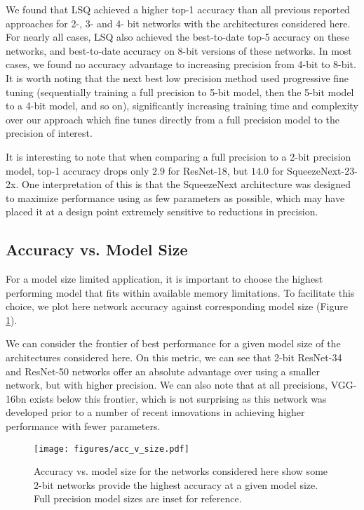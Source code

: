 \documentclass{article}
\begin{document}
We found that LSQ achieved a higher top-1 accuracy than all previous reported approaches for 2-, 3- and 4- bit networks with the architectures considered here.
For nearly all cases, LSQ also achieved the best-to-date top-5 accuracy on these networks, and best-to-date accuracy on 8-bit versions of these networks.
In most cases, we found no accuracy advantage to increasing precision from 4-bit to 8-bit.
It is worth noting that the next best low precision method \citep{jung2018joint} used progressive fine tuning (sequentially training a full precision to 5-bit model, then the 5-bit model to a 4-bit model, and so on), significantly increasing training time and complexity over our approach which fine tunes directly from a full precision model to the precision of interest.


It is interesting to note that when comparing a full precision to a 2-bit precision model, top-1 accuracy drops only $2.9$ for ResNet-18, but $14.0$ for SqueezeNext-23-2x.
One interpretation of this is that the SqueezeNext architecture was designed to maximize performance using as few parameters as possible, which may have placed it at a design point extremely sensitive to reductions in precision.



\subsection{Accuracy vs. Model Size}

For a model size limited application, it is important to choose the highest performing model that fits within available memory limitations.  To facilitate this choice, we plot here network accuracy against corresponding model size (Figure \ref{fig:acc_v_size}).

We can consider the frontier of best performance for a given model size of the architectures considered here.
On this metric, we can see that 2-bit ResNet-34 and ResNet-50 networks offer an absolute advantage over using a smaller network, but with higher precision.
We can also note that at all precisions, VGG-16bn exists below this frontier, which is not surprising as this network was developed prior to a number of recent innovations in achieving higher performance with fewer parameters.


\begin{figure}[ht]
\begin{center}
  	\centerline{\texttt{[image: figures/acc\_v\_size.pdf]}}
  \caption{
  	Accuracy vs. model size for the networks considered here show some 2-bit networks provide the highest accuracy at a given model size.  Full precision model sizes are inset for reference.
}
    	\label{fig:acc_v_size}
  	\end{center}
\end{figure}
\end{document}
